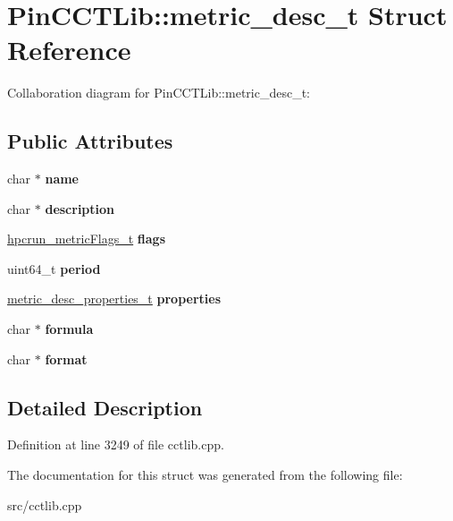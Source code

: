 \hypertarget{structPinCCTLib_1_1metric__desc__t}{\section{Pin\-C\-C\-T\-Lib\-:\-:metric\-\_\-desc\-\_\-t Struct Reference}
\label{structPinCCTLib_1_1metric__desc__t}
}


Collaboration diagram for Pin\-C\-C\-T\-Lib\-:\-:metric\-\_\-desc\-\_\-t\-:
\subsection*{Public Attributes}
\begin{DoxyCompactItemize}
\item 
\hypertarget{structPinCCTLib_1_1metric__desc__t_a6c5f38ea349c18b4b31e77c35041f8f7}{char $\ast$ {\bfseries name}}\label{structPinCCTLib_1_1metric__desc__t_a6c5f38ea349c18b4b31e77c35041f8f7}

\item 
\hypertarget{structPinCCTLib_1_1metric__desc__t_aca959d27e86e4c320802cefa6345d144}{char $\ast$ {\bfseries description}}\label{structPinCCTLib_1_1metric__desc__t_aca959d27e86e4c320802cefa6345d144}

\item 
\hypertarget{structPinCCTLib_1_1metric__desc__t_a6b26773de04d1ca0516020b551d6b78a}{\hyperlink{unionPinCCTLib_1_1hpcrun__metricFlags__t}{hpcrun\-\_\-metric\-Flags\-\_\-t} {\bfseries flags}}\label{structPinCCTLib_1_1metric__desc__t_a6b26773de04d1ca0516020b551d6b78a}

\item 
\hypertarget{structPinCCTLib_1_1metric__desc__t_a9eed6c590e9dc9390836983e8d58d820}{uint64\-\_\-t {\bfseries period}}\label{structPinCCTLib_1_1metric__desc__t_a9eed6c590e9dc9390836983e8d58d820}

\item 
\hypertarget{structPinCCTLib_1_1metric__desc__t_a0cd30e67d4803757cc97432a3371dae9}{\hyperlink{structPinCCTLib_1_1metric__desc__properties__t}{metric\-\_\-desc\-\_\-properties\-\_\-t} {\bfseries properties}}\label{structPinCCTLib_1_1metric__desc__t_a0cd30e67d4803757cc97432a3371dae9}

\item 
\hypertarget{structPinCCTLib_1_1metric__desc__t_a086a9d6817b5b225c7295b0d7c860879}{char $\ast$ {\bfseries formula}}\label{structPinCCTLib_1_1metric__desc__t_a086a9d6817b5b225c7295b0d7c860879}

\item 
\hypertarget{structPinCCTLib_1_1metric__desc__t_ab7590676bc8bc1ccbb2fe3417e23aea5}{char $\ast$ {\bfseries format}}\label{structPinCCTLib_1_1metric__desc__t_ab7590676bc8bc1ccbb2fe3417e23aea5}

\end{DoxyCompactItemize}


\subsection{Detailed Description}


Definition at line 3249 of file cctlib.\-cpp.



The documentation for this struct was generated from the following file\-:\begin{DoxyCompactItemize}
\item 
src/cctlib.\-cpp\end{DoxyCompactItemize}
